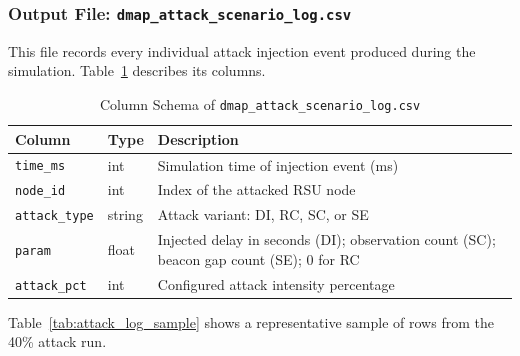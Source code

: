\subsubsection{Output File: \texttt{dmap\_attack\_scenario\_log.csv}}

This file records every individual attack injection
event produced during the simulation.
Table~\ref{tab:attack_log_schema} describes its
columns.

\begin{table}[htb]
\centering
\caption{Column Schema of
\texttt{dmap\_attack\_scenario\_log.csv}}
\label{tab:attack_log_schema}
\setlength{\tabcolsep}{4pt}
\begin{tabular}{lll}
\hline
\textbf{Column} & \textbf{Type} & \textbf{Description} \\
\hline
\texttt{time\_ms}     & int    &
  Simulation time of injection event (ms) \\
\texttt{node\_id}     & int    &
  Index of the attacked RSU node \\
\texttt{attack\_type} & string &
  Attack variant: DI, RC, SC, or SE \\
\texttt{param}        & float  &
  Injected delay in seconds (DI); observation
  count (SC); beacon gap count (SE); 0 for RC \\
\texttt{attack\_pct}  & int    &
  Configured attack intensity percentage \\
\hline
\end{tabular}
\end{table}

Table~\ref{tab:attack_log_sample} shows a
representative sample of rows from the 40\% attack
run.

